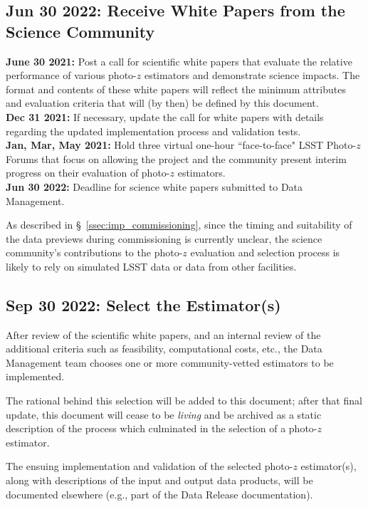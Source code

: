 \documentclass[DM,lsstdraft,toc]{lsstdoc}
\begin{document}
\subsection{Jun 30 2022: Receive White Papers from the Science Community}\label{ssec:time_wp}

{\bf June 30 2021:} Post a call for scientific white papers that evaluate the relative performance of various photo-$z$ estimators and demonstrate science impacts.
The format and contents of these white papers will reflect the minimum attributes and evaluation criteria that will (by then) be defined by this document. \\
{\bf Dec 31 2021:} If necessary, update the call for white papers with details regarding the updated implementation process and validation tests. \\
{\bf Jan, Mar, May 2021:} Hold three virtual one-hour ``face-to-face" LSST Photo-$z$ Forums that focus on allowing the project and the community present interim progress on their evaluation of photo-$z$ estimators. \\
{\bf Jun 30 2022:} Deadline for science white papers submitted to Data Management.

As described in \S~\ref{ssec:imp_commissioning}, since the timing and suitability of the data previews during commissioning is currently unclear, the science community's contributions to the photo-$z$ evaluation and selection process is likely to rely on simulated LSST data or data from other facilities.

\subsection{Sep 30 2022: Select the Estimator(s)}\label{ssec:time_sel}

After review of the scientific white papers, and an internal review of the additional criteria such as feasibility, computational costs, etc., the Data Management team chooses one or more community-vetted estimators to be implemented.

The rational behind this selection will be added to this document; after that final update, this document will cease to be {\it living} and be archived as a static description of the process which culminated in the selection of a photo-$z$ estimator.

The ensuing implementation and validation of the selected photo-$z$ estimator(s), along with descriptions of the input and output data products, will be documented elsewhere (e.g., part of the Data Release documentation).
\end{document}
